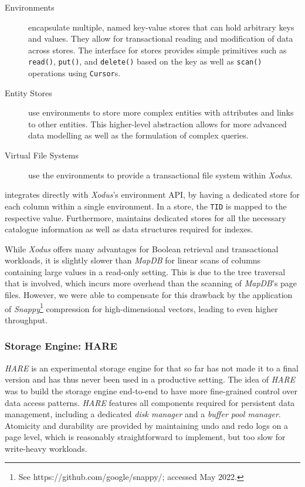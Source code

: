 \begin{description}
    \item [Environments] encapsulate multiple, named key-value stores that can hold arbitrary keys and values. They allow for transactional reading and modification of data across stores. The interface for stores provides simple primitives such as \texttt{read()}, \texttt{put()}, and \texttt{delete()} based on the key as well as \texttt{scan()} operations using \texttt{Cursor}s.
    \item [Entity Stores] use environments to store more complex entities with attributes and links to other entities. This higher-level abstraction allows for more advanced data modelling as well as the formulation of complex queries.
    \item [Virtual File Systems] use the environments to provide a transactional file system within \emph{Xodus}.
\end{description}

\cottontail{} integrates directly with \emph{Xodus}'s environment API, by having a dedicated store for each column within a single environment. In a store, the \texttt{TID} is mapped to the respective value. Furthermore, \cottontail{} maintains dedicated stores for all the necessary catalogue information as well as data structures required for indexes.

While \emph{Xodus} offers many advantages for Boolean retrieval and transactional workloads, it is slightly slower than \emph{MapDB} for linear scans of columns containing large values in a read-only setting. This is due to the tree traversal that is involved, which incurs more overhead than the scanning of \emph{MapDB}'s page files. However, we were able to compensate for this drawback by the application of \emph{Snappy}\footnote{See https://github.com/google/snappy/; accessed May 2022.} compression for high-dimensional vectors, leading to even higher throughput.

\subsubsection{Storage Engine: HARE}

\emph{HARE} is an experimental storage engine for \cottontail{} that so far has not made it to a final version and has thus never been used in a productive setting. The idea of \emph{HARE} was to build the storage engine end-to-end to have more fine-grained control over data access patterns. \emph{HARE} features all components required for persistent data management, including a dedicated \emph{disk manager} and a \emph{buffer pool manager}. Atomicity and durability are provided by maintaining undo and redo logs on a page level, which is reasonably straightforward to implement, but too slow for write-heavy workloads.

